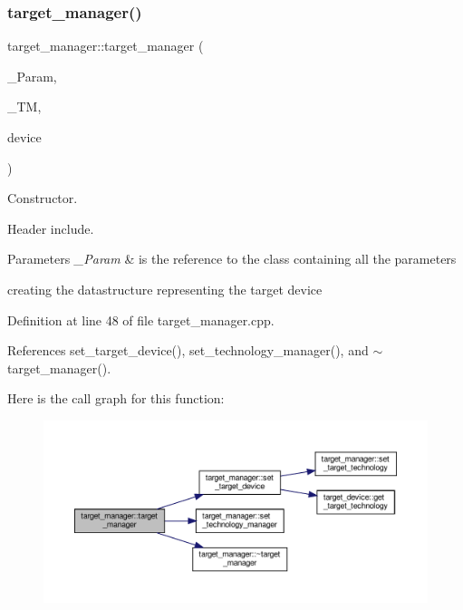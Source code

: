 \subsubsection{\texorpdfstring{target\+\_\+manager()}{target\_manager()}}
{\footnotesize\ttfamily target\+\_\+manager\+::target\+\_\+manager (\begin{DoxyParamCaption}\item[{const \hyperlink{Parameter_8hpp_a37841774a6fcb479b597fdf8955eb4ea}{Parameter\+Const\+Ref} \&}]{\+\_\+\+Param,  }\item[{const \hyperlink{technology__manager_8hpp_a4b9ecd440c804109c962654f9227244e}{technology\+\_\+manager\+Ref} \&}]{\+\_\+\+TM,  }\item[{const \hyperlink{target__device_8hpp_acedb2b7a617e27e6354a8049fee44eda}{target\+\_\+device\+Ref} \&}]{device }\end{DoxyParamCaption})}



Constructor. 

Header include.


\begin{DoxyParams}{Parameters}
{\em \+\_\+\+Param} & is the reference to the class containing all the parameters \\
\hline
\end{DoxyParams}
creating the datastructure representing the target device 

Definition at line 48 of file target\+\_\+manager.\+cpp.



References set\+\_\+target\+\_\+device(), set\+\_\+technology\+\_\+manager(), and $\sim$target\+\_\+manager().

Here is the call graph for this function\+:
\nopagebreak
\begin{figure}[H]
\begin{center}
\leavevmode
\includegraphics[width=350pt]{da/d43/classtarget__manager_abdffc4b87550d63ae0e389b69c8de199_cgraph}
\end{center}
\end{figure}
\mbox{\label{classtarget__manager_a0242b720a0790005dc499fbc30c677e2}} 
